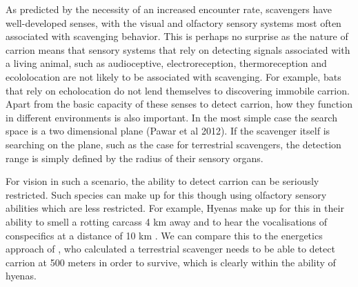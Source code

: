 \documentclass[a4paper,12pt]{article}
\begin{document}
As predicted by the necessity of an increased encounter rate, scavengers have well-developed senses, with the visual and olfactory sensory systems most often associated with scavenging behavior. This is perhaps no surprise as the nature of carrion means that sensory systems that rely on detecting signals associated with a living animal, such as audioceptive, electroreception, thermoreception and ecololocation are not likely to be associated with scavenging. For example, bats that rely on echolocation do not lend themselves to discovering immobile carrion.
%
Apart from the basic capacity of these senses to detect carrion, how they function in different environments is also important. In the most simple case the search space is a two dimensional plane (Pawar et al 2012). If the scavenger itself is searching on the plane, such as the case for terrestrial scavengers, the detection range is simply defined by the radius of their sensory organs.

For vision in such a scenario, the ability to detect carrion can be seriously restricted. Such species can make up for this though using olfactory sensory abilities which are less restricted.
For example, Hyenas make up for this in their ability to smell a rotting carcass 4 km away and to hear the vocalisations of conspecifics at a distance of 10 km \citep{mills1989comparative}. 
We can compare this to the energetics approach of \cite{ruxton2004obligate}, who calculated a terrestrial scavenger needs to be able to detect carrion at 500 meters in order to survive, which is clearly within the ability of hyenas.
\end{document}
